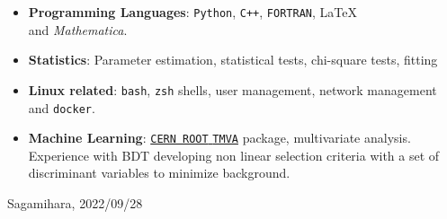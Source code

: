 \documentclass[a4paper]{article}
\begin{document}
\begin{itemize}
	\item \textbf{Programming Languages}: \texttt{Python}, \texttt{C++}, \texttt{FORTRAN}, \LaTeX \\  and \textit{Mathematica}.
  \item \textbf{Statistics}: Parameter estimation, statistical tests, chi-square
    tests, fitting
  \item \textbf{Linux related}: \texttt{bash}, \texttt{zsh} shells, user
    management, network management and \texttt{docker}.
  \item \textbf{Machine Learning}: \href{https://root.cern/manual/tmva/}{\texttt{CERN ROOT} \texttt{TMVA}} package,
    multivariate analysis. Experience with BDT developing non linear selection
    criteria with a set of discriminant variables to minimize background.
  \end{itemize}
\vspace{2\baselineskip}
\noindent Sagamihara, 2022/09/28
\end{document}

